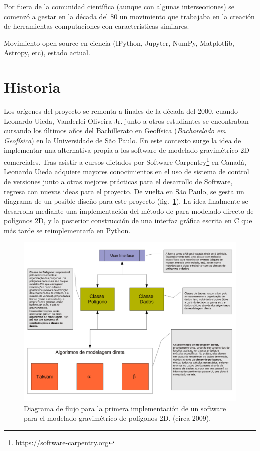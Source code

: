 Por fuera de la comunidad científica (aunque con algunas intersecciones) se
comenzó a gestar en la década del 80 un movimiento que trabajaba en la creación
de herramientas computaciones con características similares.

Movimiento open-source en ciencia (IPython, Jupyter, NumPy, Matplotlib,
Astropy, etc), estado actual.


\section{Historia}

Los orígenes del proyecto se remonta a finales de la década del 2000, cuando
Leonardo Uieda, Vanderlei Oliveira Jr. junto a otros estudiantes se encontraban
cursando los últimos años del Bachillerato en Geofísica (\emph{Bacharelado em
Geofísica}) en la Universidade de São Paulo.
En este contexto surge la idea de implementar una alternativa propia a los
software de modelado gravimétrico 2D comerciales.
Tras asistir a cursos dictados por
Software Carpentry\footnote{%
    \url{https://software-carpentry.org}
}
en Canadá, Leonardo Uieda adquiere mayores conocimientos en el uso de sistema
de control de versiones junto a otras mejores prácticas para el desarrollo de
Software, regresa con nuevas ideas para el proyecto.
De vuelta en São Paulo, se gesta un diagrama de un posible diseño para este
proyecto (fig.~\ref{fig:talwani-idea}).
La idea finalmente se desarrolla mediante una implementación del método de
\citet{talwani1959} para modelado directo de polígonos 2D, y la posterior
construcción de una interfaz gráfica escrita en C que más tarde se
reimplementaría en Python.

\begin{figure}[h]
    \centering
    \includegraphics[width=\linewidth]{figs/fluxo-simples.pdf}
    \caption{
        Diagrama de flujo para la primera implementación de un software para el
        modelado gravimétrico de polígonos 2D.
        (circa 2009).
    }
    \label{fig:talwani-idea}
\end{figure}

